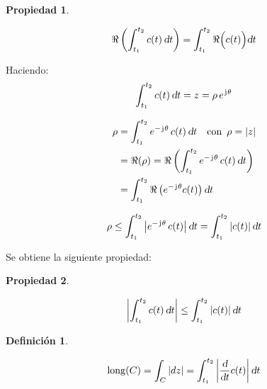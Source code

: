 \documentclass[a5paper,12pt,twoside]{book}
\newtheorem{defn}{{Definición}}[chapter]
\newtheorem{prop}{{Propiedad}}[chapter]
\begin{document}
\begin{mdframed}[style=PropertyFrame]
    \begin{prop}
    \end{prop}
    \begin{equation*}
        \Re \left( \int_{t_1}^{t_2} c(t) \, \textsl{d} t \right) = \int_{t_1}^{t_2} \Re \Big( c(t) \Big) \textsl{d} t
    \end{equation*}
\end{mdframed}

Haciendo:
\begin{equation*}
    \int_{t_1}^{t_2} c(t) \, \textsl{d} t = z = \rho \, e^{\mkern2mu\mathrm{j}\mkern1mu \theta}
\end{equation*}

\begin{align*}
    \rho &= \int_{t_1}^{t_2} e^{-\mkern2mu\mathrm{j}\mkern1mu \theta} \, c(t) \, \textsl{d} t \quad \textrm{con} \enspace \rho = {\left| {z} \right|}
    \\
    &= \Re (\rho) = \Re \left( \int_{t_1}^{t_2} e^{-\mkern2mu\mathrm{j}\mkern1mu \theta} \, c(t) \, \textsl{d} t \right)
    \\
    &= \int_{t_1}^{t_2} \Re \left( e^{-\mkern2mu\mathrm{j}\mkern1mu \theta} c(t) \right) \textsl{d} t 
\end{align*}

\begin{equation*}
    \rho \leq \int_{t_1}^{t_2} {\left| {e^{-\mkern2mu\mathrm{j}\mkern1mu \theta} \, c(t)} \right|} \, \textsl{d} t = \int_{t_1}^{t_2} {\left| {c(t)} \right|} \, \textsl{d} t
\end{equation*}

Se obtiene la siguiente propiedad:

\begin{mdframed}[style=PropertyFrame]
    \begin{prop}
    \end{prop}
    \begin{equation*}
        {\left| {\int_{t_1}^{t_2} c(t) \, \textsl{d}t} \right|} \leq \int_{t_1}^{t_2} {\left| {c(t)} \right|} \, \textsl{d} t
    \end{equation*}
\end{mdframed}

\begin{mdframed}[style=DefinitionFrame]
    \begin{defn}
    \end{defn}
    \begin{equation*}
        \operatorname{long} (C) = \int_C {\left| {dz} \right|} = \int_{t_1}^{t_2} {\left| {\frac{\textsl{d}}{\textsl{d} t} c(t)} \right|} \, \textsl{d} t
    \end{equation*}
\end{mdframed}
\end{document}
